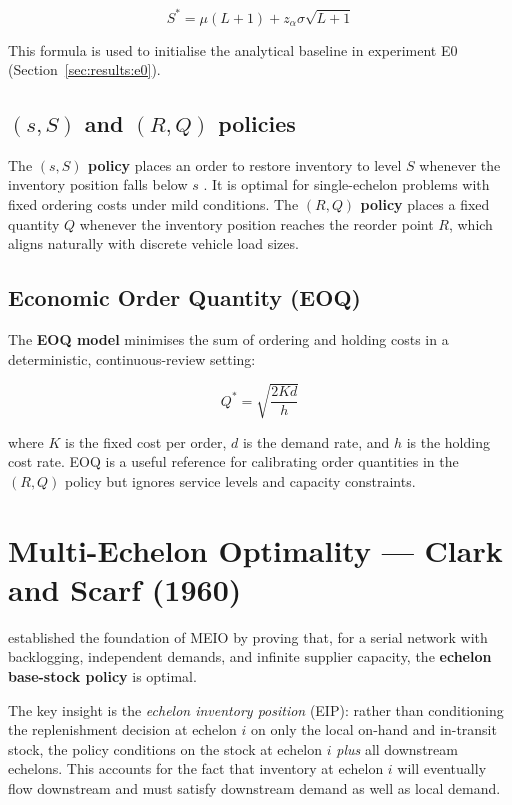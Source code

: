 \begin{equation}
  S^* = \mu(L+1) + z_\alpha \sigma\sqrt{L+1}
  \label{eq:bs-optimal}
\end{equation}

This formula is used to initialise the analytical baseline in
experiment E0 (Section~\ref{sec:results:e0}).

\subsection{$(s,S)$ and $(R,Q)$ policies}

The \textbf{$(s,S)$ policy} places an order to restore inventory to level
$S$ whenever the inventory position falls below $s$
\citep{ScaRf1960MathOptInventory}.  It is optimal for single-echelon
problems with fixed ordering costs under mild conditions.  The
\textbf{$(R,Q)$ policy} places a fixed quantity $Q$ whenever the
inventory position reaches the reorder point $R$, which aligns naturally
with discrete vehicle load sizes.

\subsection{Economic Order Quantity (EOQ)}

The \textbf{EOQ model} \citep{Harris1913} minimises the sum of ordering
and holding costs in a deterministic, continuous-review setting:

\begin{equation}
  Q^* = \sqrt{\frac{2Kd}{h}}
\end{equation}

where $K$ is the fixed cost per order, $d$ is the demand rate, and $h$
is the holding cost rate.  EOQ is a useful reference for calibrating
order quantities in the $(R,Q)$ policy but ignores service levels and
capacity constraints.

\section{Multi-Echelon Optimality --- Clark and Scarf (1960)}
\label{sec:lit:clarkscarf}

\citet{ClarkScarf1960} established the foundation of MEIO by proving that,
for a serial network with backlogging, independent demands, and infinite
supplier capacity, the \textbf{echelon base-stock policy} is optimal.

The key insight is the \emph{echelon inventory position} (EIP): rather
than conditioning the replenishment decision at echelon $i$ on only the
local on-hand and in-transit stock, the policy conditions on the stock
at echelon $i$ \emph{plus} all downstream echelons.  This accounts for
the fact that inventory at echelon $i$ will eventually flow downstream
and must satisfy downstream demand as well as local demand.

